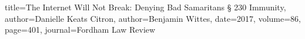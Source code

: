 
{
title={The Internet Will Not Break: Denying Bad Samaritans § 230 Immunity},
author={Danielle Keats Citron},
author={Benjamin Wittes},
date={2017},
volume=86,
page=401,
journal=Fordham Law Review
}
